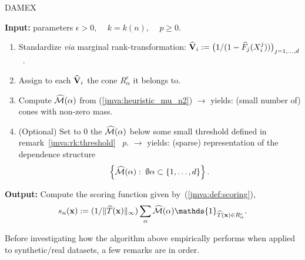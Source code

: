 \begin{algorithm}[!tbh]
\caption{DAMEX}
\label{jmva:DAMEX-algo}
{\bf Input:} parameters $\epsilon>0$,~~ $k = k(n)$,~~ $p\geq 0$.
\begin{enumerate}
\item Standardize \emph{via} marginal rank-transformation: $\mathbf{ \widehat V}_i:= \big (1/(1- \widehat F_j (X_i^j))\big)_{j=1,\ldots,d}$~.
\item Assign to each $\mathbf{\widehat V}_i$ the cone $R_\alpha^\epsilon$
  it belongs to.  
\item Compute $\widehat{\mathcal{M}}(\alpha)$ from (\ref{jmva:heuristic_mu_n2})
   $\rightarrow$ yields: (small number of) cones with non-zero mass.
\item (Optional) Set to $0$ the $\widehat{\mathcal{M}}(\alpha)$ below some small
  threshold defined in remark~\ref{jmva:rk:threshold} \wrt~$p$.%
   $\rightarrow$ yields: (sparse) representation of the dependence
  structure 
 \begin{align}
 \label{jmva:phi_n}
\left\{\hatmass(\alpha):\; \emptyset\alpha\subset\{1,\ldots, d\}\right\}.%
 \end{align}
\end{enumerate}
{\bf Output:} Compute the scoring function given
by~(\ref{jmva:def:scoring}), 
\begin{align*}
s_n(\mb x):= (1/\|\widehat T(\mb x)\|_\infty)
\sum_{\alpha }%
\hatmass(\alpha) \mathds{1}_{\widehat T(\mb x) \in R_\alpha^\epsilon}.
\end{align*}
\end{algorithm}

Before investigating how the algorithm above empirically performs when applied to synthetic/real datasets, a few remarks are in order.


